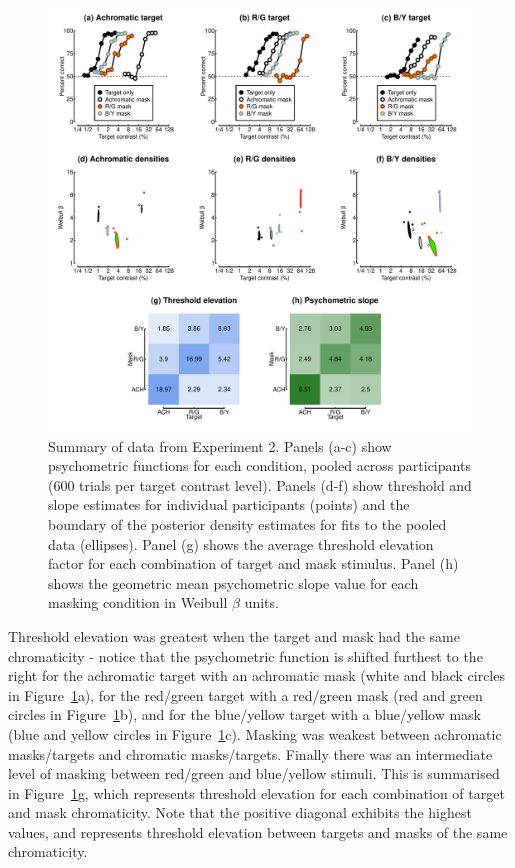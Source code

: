 \documentclass[
  letterpaper,
  DIV=11,
  numbers=noendperiod]{scrartcl}
\begin{document}
\begin{figure}

{\centering \includegraphics{Figures/MCSdata.pdf}

}

\caption{\label{fig-MCSfig}Summary of data from Experiment 2. Panels
(a-c) show psychometric functions for each condition, pooled across
participants (600 trials per target contrast level). Panels (d-f) show
threshold and slope estimates for individual participants (points) and
the boundary of the posterior density estimates for fits to the pooled
data (ellipses). Panel (g) shows the average threshold elevation factor
for each combination of target and mask stimulus. Panel (h) shows the
geometric mean psychometric slope value for each masking condition in
Weibull \(\beta\) units.}

\end{figure}

Threshold elevation was greatest when the target and mask had the same
chromaticity - notice that the psychometric function is shifted furthest
to the right for the achromatic target with an achromatic mask (white
and black circles in Figure~\ref{fig-MCSfig}a), for the red/green target
with a red/green mask (red and green circles in
Figure~\ref{fig-MCSfig}b), and for the blue/yellow target with a
blue/yellow mask (blue and yellow circles in Figure~\ref{fig-MCSfig}c).
Masking was weakest between achromatic masks/targets and chromatic
masks/targets. Finally there was an intermediate level of masking
between red/green and blue/yellow stimuli. This is summarised in
Figure~\ref{fig-MCSfig}g, which represents threshold elevation for each
combination of target and mask chromaticity. Note that the positive
diagonal exhibits the highest values, and represents threshold elevation
between targets and masks of the same chromaticity.
\end{document}
